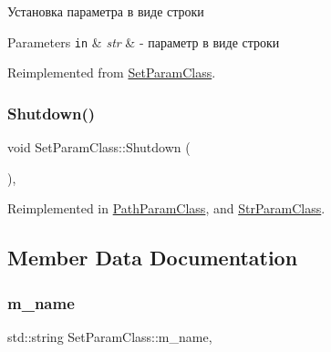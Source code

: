 Установка параметра в виде строки 


\begin{DoxyParams}[1]{Parameters}
\mbox{\tt in}  & {\em str} & -\/ параметр в виде строки \\
\hline
\end{DoxyParams}


Reimplemented from \hyperlink{class_set_param_class_aabba4e8a9b148582f40486e662408bf9}{Set\+Param\+Class}.

\mbox{\label{class_set_param_class_afdb63374ca8c32f6678ba34e050e9071}} 
\subsubsection{\texorpdfstring{Shutdown()}{Shutdown()}}
{\footnotesize\ttfamily void Set\+Param\+Class\+::\+Shutdown (\begin{DoxyParamCaption}{ }\end{DoxyParamCaption})\hspace{0.3cm}{\ttfamily [virtual]}, {\ttfamily [inherited]}}



Reimplemented in \hyperlink{class_path_param_class_a24f272557eaa32ca6ee758932a7e5a97}{Path\+Param\+Class}, and \hyperlink{class_str_param_class_ae84185574803c2877e3b1b21a70fa6ac}{Str\+Param\+Class}.



\subsection{Member Data Documentation}
\mbox{\label{class_set_param_class_aab204889210304af482b414a6f8dbe82}} 
\subsubsection{\texorpdfstring{m\+\_\+name}{m\_name}}
{\footnotesize\ttfamily std\+::string Set\+Param\+Class\+::m\+\_\+name\hspace{0.3cm}{\ttfamily [protected]}, {\ttfamily [inherited]}}



